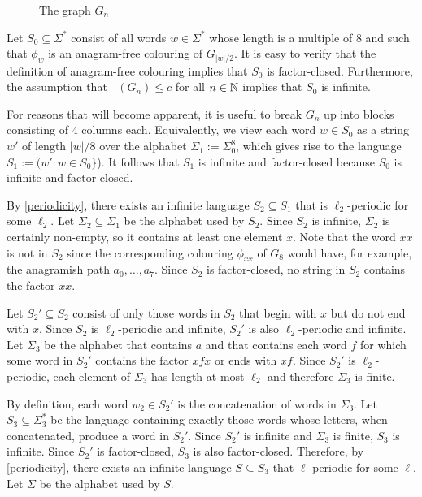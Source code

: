 \documentclass{patmorin}
\DeclareMathOperator{\afcn}{\dot{\chi}_\pi}
\begin{document}
\begin{figure}
    \caption{The graph $G_n$}
    \label{g_n}
\end{figure}


Let $S_0\subseteq \Sigma^*$ consist of all words $w\in \Sigma^*$ whose length is a multiple of $8$ and such that $\phi_w$ is an anagram-free colouring of $G_{|w|/2}$.  It is easy to verify that the definition of anagram-free colouring implies that $S_0$ is factor-closed.  Furthermore, the assumption that $\afcn(G_n)\le c$ for all $n\in\mathbb{N}$ implies that $S_0$ is infinite.

For reasons that will become apparent, it is useful to break $G_n$ up into blocks consisting of $4$ columns each.  Equivalently, we view each word $w\in S_0$ as a string $w'$ of length $|w|/8$ over the alphabet $\Sigma_1:=\Sigma_0^8$, which gives rise to the language $S_1:=(w': w\in S_0\}$).  It follows that $S_1$ is infinite and factor-closed because $S_0$ is infinite and factor-closed.

By \cref{periodicity}, there exists an infinite language $S_2\subseteq S_1$ that is $\ell_2$-periodic for some $\ell_2$. Let $\Sigma_2\subseteq \Sigma_1$ be the alphabet used by $S_2$.  Since $S_2$ is infinite, $\Sigma_2$ is certainly non-empty, so it contains at least one element $x$.  Note that the word $xx$ is not in $S_2$ since the corresponding colouring $\phi_{xx}$ of $G_8$ would have, for example, the anagramish path $a_0,\ldots,a_7$.  Since $S_2$ is factor-closed, no string in $S_2$ contains the factor $xx$.

Let $S_2'\subseteq S_2$ consist of only those words in $S_2$ that begin with $x$ but do not end with $x$.  Since $S_2$ is $\ell_2$-periodic and infinite, $S_2'$ is also $\ell_2$-periodic and infinite.  Let $\Sigma_3$ be the alphabet that contains $a$ and that contains each word $f$ for which some word in $S_2'$ contains the factor $xfx$ or ends with $xf$.  Since $S_2'$ is $\ell_2$-periodic, each element of $\Sigma_3$ has length at most $\ell_2$ and therefore $\Sigma_3$ is finite.

By definition, each word $w_2\in S_2'$ is the concatenation of words in $\Sigma_3$. Let $S_3\subseteq \Sigma_3^*$ be the language containing exactly those words whose letters, when concatenated, produce a word in $S_2'$.  Since $S_2'$ is infinite and $\Sigma_3$ is finite, $S_3$ is infinite.  Since $S_2'$ is factor-closed, $S_3$ is also factor-closed.  Therefore, by \cref{periodicity}, there exists an infinite language $S\subseteq S_3$ that $\ell$-periodic for some $\ell$.  Let $\Sigma$ be the alphabet used by $S$.
\end{document}
